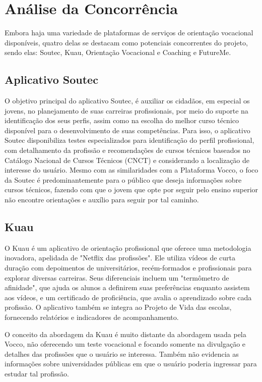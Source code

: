 \section{Análise da Concorrência}

Embora haja uma variedade de plataformas de serviços de orientação vocacional disponíveis, quatro delas se destacam como potenciais concorrentes do projeto, sendo elas: Soutec, Kuau, Orientação Vocacional e Coaching e FutureMe.

\subsection{Aplicativo Soutec}
O objetivo principal do aplicativo Soutec,  é auxiliar os cidadãos, em especial os jovens, no planejamento de suas carreiras profissionais, por meio do suporte na identificação dos seus perfis, assim como na escolha do melhor curso técnico disponível para o desenvolvimento de suas competências. Para isso, o aplicativo Soutec disponibiliza testes especializados para identificação do perfil profissional, com detalhamento da profissão e recomendações de cursos técnicos baseados no Catálogo Nacional de Cursos Técnicos (CNCT) e considerando a localização de interesse do usuário.
 Mesmo com as similaridades com a Plataforma Vocco, o foco da Soutec é predominantemente para o público que deseja informações sobre cursos técnicos, fazendo com que o jovem que opte por seguir pelo ensino superior não encontre orientações e auxílio para seguir por tal caminho.


\subsection{Kuau}
O Kuau é um aplicativo de orientação profissional que oferece uma metodologia inovadora, apelidada de "Netflix das profissões". Ele utiliza vídeos de curta duração com depoimentos de universitários, recém-formados e profissionais para explorar diversas carreiras. Seus diferenciais incluem um "termômetro de afinidade", que ajuda os alunos a definirem suas preferências enquanto assistem aos vídeos, e um certificado de proficiência, que avalia o aprendizado sobre cada profissão. O aplicativo também se integra ao Projeto de Vida das escolas, fornecendo relatórios e indicadores de acompanhamento​​.

O conceito da abordagem da Kuau é muito distante da abordagem usada pela Vocco, não oferecendo um teste vocacional  e focando somente na divulgação e detalhes das profissões que o usuário se interessa. Também não evidencia as informações sobre universidades públicas em que o usuário poderia ingressar para estudar tal profissão.

